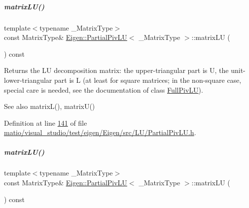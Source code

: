 \mbox{\label{group___l_u___module_abea0d7e51c5591a6db152eade0892d9c}} 
\subparagraph{\texorpdfstring{matrix\+L\+U()}{matrixLU()}\hspace{0.1cm}{\footnotesize\ttfamily [1/2]}}
{\footnotesize\ttfamily template$<$typename \+\_\+\+Matrix\+Type$>$ \\
const Matrix\+Type\& \hyperlink{group___l_u___module_class_eigen_1_1_partial_piv_l_u}{Eigen\+::\+Partial\+Piv\+LU}$<$ \+\_\+\+Matrix\+Type $>$\+::matrix\+LU (\begin{DoxyParamCaption}{ }\end{DoxyParamCaption}) const\hspace{0.3cm}{\ttfamily [inline]}}

\begin{DoxyReturn}{Returns}
the LU decomposition matrix\+: the upper-\/triangular part is U, the unit-\/lower-\/triangular part is L (at least for square matrices; in the non-\/square case, special care is needed, see the documentation of class \hyperlink{group___l_u___module_class_eigen_1_1_full_piv_l_u}{Full\+Piv\+LU}).
\end{DoxyReturn}
\begin{DoxySeeAlso}{See also}
matrix\+L(), matrix\+U() 
\end{DoxySeeAlso}


Definition at line \hyperlink{matio_2visual__studio_2test_2eigen_2_eigen_2src_2_l_u_2_partial_piv_l_u_8h_source_l00141}{141} of file \hyperlink{matio_2visual__studio_2test_2eigen_2_eigen_2src_2_l_u_2_partial_piv_l_u_8h_source}{matio/visual\+\_\+studio/test/eigen/\+Eigen/src/\+L\+U/\+Partial\+Piv\+L\+U.\+h}.

\mbox{\label{group___l_u___module_abea0d7e51c5591a6db152eade0892d9c}} 
\subparagraph{\texorpdfstring{matrix\+L\+U()}{matrixLU()}\hspace{0.1cm}{\footnotesize\ttfamily [2/2]}}
{\footnotesize\ttfamily template$<$typename \+\_\+\+Matrix\+Type$>$ \\
const Matrix\+Type\& \hyperlink{group___l_u___module_class_eigen_1_1_partial_piv_l_u}{Eigen\+::\+Partial\+Piv\+LU}$<$ \+\_\+\+Matrix\+Type $>$\+::matrix\+LU (\begin{DoxyParamCaption}{ }\end{DoxyParamCaption}) const\hspace{0.3cm}{\ttfamily [inline]}}

